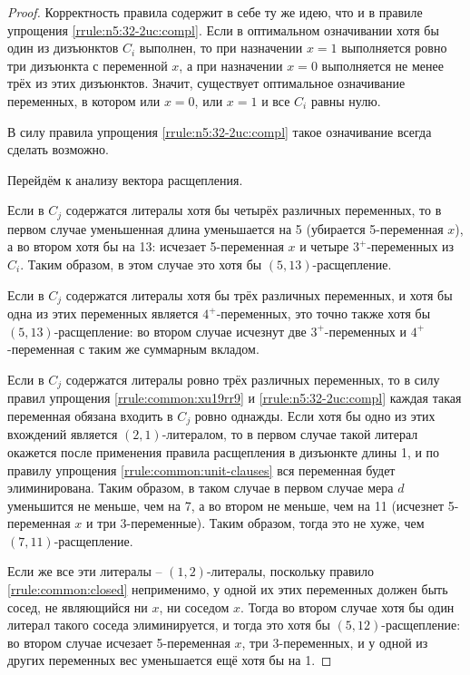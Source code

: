 \begin{proof}
 Корректность правила содержит в себе ту же идею, что и в правиле упрощения \ref{rrule:n5:32-2uc:compl}. Если в оптимальном означивании хотя бы один из дизъюнктов $C_i$ выполнен, то при назначении $x = 1$ выполняется ровно три дизъюнкта с переменной $x$, а при назначении $x = 0$ выполняется не менее трёх из этих дизъюнктов. Значит, существует оптимальное означивание переменных, в котором или $x = 0$, или $x = 1$ и все $C_i$ равны нулю.

 В силу правила упрощения \ref{rrule:n5:32-2uc:compl} такое означивание всегда сделать возможно.

 Перейдём к анализу вектора расщепления.

 Если в $C_j$ содержатся литералы хотя бы четырёх различных переменных, то в первом случае уменьшенная длина уменьшается на 5 (убирается 5-переменная $x$), а во втором хотя бы на 13: исчезает 5-переменная $x$ и четыре $3^+$-переменных из $C_i$. Таким образом, в этом случае это хотя бы $(5,13)$-расщепление.

  Если в $C_j$ содержатся литералы хотя бы трёх различных переменных, и хотя бы одна из этих переменных является $4^+$-переменных, это точно также хотя бы $(5,13)$-расщепление: во втором случае исчезнут две $3^+$-переменных и $4^+$-переменная с таким же суммарным вкладом.

  Если в $C_j$ содержатся литералы ровно трёх различных переменных, то в силу правил упрощения \ref{rrule:common:xu19rr9} и \ref{rrule:n5:32-2uc:compl} каждая такая переменная обязана входить в $C_j$ ровно однажды. Если хотя бы одно из этих вхождений является $(2,1)$-литералом, то в первом случае такой литерал окажется после применения правила расщепления в дизъюнкте длины 1, и по правилу упрощения \ref{rrule:common:unit-clauses} вся переменная будет элиминирована. Таким образом, в таком случае в первом случае мера $d$ уменьшится не меньше, чем на 7, а во втором не меньше, чем на 11 (исчезнет 5-переменная $x$ и три 3-переменные). Таким образом, тогда это не хуже, чем $(7,11)$-расщепление.

  Если же все эти литералы -- $(1,2)$-литералы, поскольку правило \ref{rrule:common:closed} неприменимо, у одной их этих переменных должен быть сосед, не являющийся ни $x$, ни соседом $x$. Тогда во втором случае хотя бы один литерал такого соседа элиминируется, и тогда это хотя бы $(5,12)$-расщепление: во втором случае исчезает 5-переменная $x$, три 3-переменных, и у одной из других переменных вес уменьшается ещё хотя бы на 1.


\end{proof}
